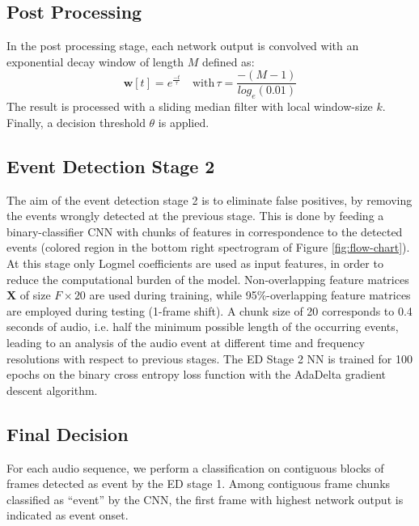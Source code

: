 \subsection{Post Processing}
\label{ssec:post_proc_1}
In the post processing stage, each network output is convolved with an exponential decay window of length $M$ defined as:
\begin{equation}
\mathbf{w}[t]= e^{\frac{−t}{\tau}} \quad \text{with}  \, \tau =  \frac{-(M-1)}{log_e(0.01)}
\end{equation}
The result is processed with a sliding median filter with local window-size $k$. Finally, a decision threshold $\theta$ is applied.

\subsection{Event Detection Stage 2}
\label{ssec:refinement}
The aim of the event detection stage 2 is to eliminate false positives, by removing the events wrongly detected at the previous stage. This is done by feeding a binary-classifier CNN with chunks of features in correspondence to the detected events (colored region in the bottom right spectrogram of Figure \ref{fig:flow-chart}). At this stage only Logmel coefficients are used as input features, in order to reduce the computational burden of the model. Non-overlapping feature matrices $\mathbf{X}$ of size $F\times20$ are used during training, while 95\%-overlapping feature matrices are employed during testing (1-frame shift).
A chunk size of 20 corresponds to 0.4 seconds of audio, i.e. half the minimum possible length of the occurring events, leading to an analysis of the audio event at different time and frequency resolutions with respect to previous stages. The ED Stage 2 NN is trained for 100 epochs on the binary cross entropy loss function with the AdaDelta gradient descent algorithm. %


\subsection{Final Decision}
\label{ssec:final_decision}
For each audio sequence, we perform a classification on contiguous blocks of frames detected as event by the ED stage 1. Among contiguous frame chunks classified as ``event'' by the CNN, the first frame with highest network output is indicated as event onset.

